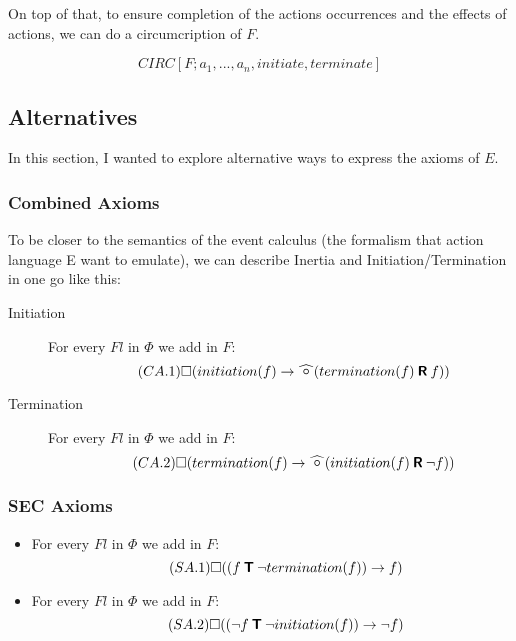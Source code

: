 On top of that, to ensure completion of the actions occurrences and the effects of actions, we can do a circumcription of $F$.

$$CIRC[F;a_1,...,a_n,initiate,terminate]$$

\subsection{Alternatives}

In this section, I wanted to explore alternative ways to express the axioms of $E$.

\subsubsection{Combined Axioms}

To be closer to the semantics of the event calculus (the formalism that action language E want to emulate), we can describe Inertia and Initiation/Termination in one go like this:
\begin{description}
  \item[Initiation]
  For every $Fl$ in $\Phi$ we add in $F$:
  \begin{equation}\tag{$CA.1$}
    \alwaysF(initiation(f)\rightarrow\wnext(termination(f) \release f))
  \end{equation}
  \item[Termination]
  For every $Fl$ in $\Phi$ we add in $F$:
  \begin{equation}\tag{$CA.2$}
    \alwaysF(termination(f)\rightarrow\wnext(initiation(f) \release \neg f))
  \end{equation}
\end{description}

\subsubsection{SEC Axioms}

\begin{itemize}
  \item
    For every $Fl$ in $\Phi$ we add in $F$:
    \begin{equation}\tag{$SA.1$}
      \square((f \mathbin{\bm{\mathsf{T}}} \neg termination(f)) \rightarrow f)
    \end{equation}
  \item
    For every $Fl$ in $\Phi$ we add in $F$:
    \begin{equation}\tag{$SA.2$}
      \square((\neg f \mathbin{\bm{\mathsf{T}}} \neg initiation(f)) \rightarrow \neg f)
    \end{equation}
\end{itemize}

